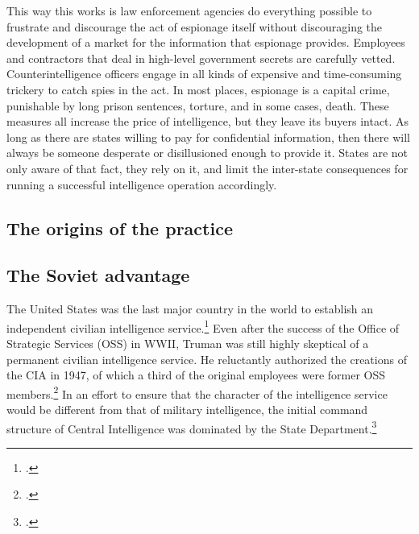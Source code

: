 \documentclass{memoir}
\begin{document}
\begin{refsegment}
This way this works is law enforcement agencies do everything possible to frustrate and discourage the act of espionage itself without discouraging the development of a market for the information that espionage provides. Employees and contractors that deal in high-level government secrets are carefully vetted. Counterintelligence officers engage in all kinds of expensive and time-consuming trickery to catch spies in the act. In most places, espionage is a capital crime, punishable by long prison sentences, torture, and in some cases, death. These measures all increase the price of intelligence, but they leave its buyers intact. As long as there are states willing to pay for confidential information, then there will always be someone desperate or disillusioned enough to provide it. States are not only aware of that fact, they rely on it, and limit the inter-state consequences for running a successful intelligence operation accordingly.

\subsection{The origins of the practice}

\subsection{The Soviet advantage}
The United States was the last major country in the world to establish an independent civilian intelligence service.\footcite[p.~35]{olson_fair_2006} Even after the success of the Office of Strategic Services (OSS) in WWII, Truman was still highly skeptical of a permanent civilian intelligence service. He reluctantly authorized the creations of the CIA in 1947, of which a third of the original employees were former OSS members.\footcite[p.~37]{olson_fair_2006} In an effort to ensure that the character of the intelligence service would be different from that of military intelligence, the initial command structure of Central Intelligence was dominated by the State Department.\footcite{troy_truman_1993}


\end{refsegment}
\end{document}
